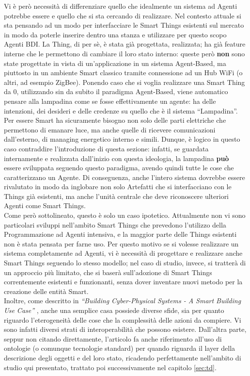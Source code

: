 \documentclass[12pt,a4paper,openright,oneside]{report}
\newcommand{\quotes}[1]{``#1''}
\begin{document}
Vi è però necessità di differenziare quello che idealmente un sistema ad Agenti potrebbe essere e quello che si sta cercando di realizzare. Nel contesto attuale si sta pensando ad un modo per interfacciare le Smart Things esistenti sul mercato in modo da poterle inserire dentro una stanza e utilizzare per questo scopo Agenti BDI. La Thing, di per sè, è stata già progettata, realizzata; ha già feature interne che le permettono di cambiare il loro stato interno: queste però \textbf{non} sono state progettate in vista di un'applicazione in un sistema Agent-Based, ma piuttosto in un ambiente Smart classico tramite connessione ad un Hub WiFi (o altri, ad esempio ZigBee).
Ponendo caso che si voglia realizzare una Smart Thing da 0, utilizzando sin da subito il paradigma Agent-Based, viene automatico pensare alla lampadina come se fosse effettivamente un agente: ha delle intenzioni, dei desideri e delle credenze su quello che è il sistema \quotes{Lampadina}. Per essere Smart ha sicuramente bisogno non solo delle parti elettriche che permettono di emanare luce, ma anche quelle di ricevere comunicazioni dall'esterno, di managing energetico interno e simili. Dunque, è logico in questo caso contraddire l'introduzione di questa sezione: infatti, se guardata internamente e realizzata dall'inizio con questa ideologia, la lampadina \textbf{può} essere sviluppata seguendo questo paradigma, avendo quindi tutte le cose che caratterizzano un Agente. Di conseguenza, anche l'intero sistema dovrebbe essere rivalutato in modo da inglobare non solo Artefatti che si interfacciano con le Things già esistenti, ma anche l'unità centrale che deve riconoscere ulteriori Agenti come Smart Things.\\

Come però sottolineato, questo è solo un caso ipotetico. Attualmente non vi sono particolari sviluppi nell'ambito Smart Things che prevedono l'utilizzo della Programmazione ad Agenti intensiva, e la maggior parte delle Things esistenti non è stata pensata per farne uso. Per questo motivo se si volesse realizzare un sistema completamente ad Agenti, vi è necessità di progettare e realizzare anche Smart Things seguendo lo stesso modello; nel caso di studio, invece, si tratterà di un approccio più limitato, che si baserà sull'adozione di Smart Things correntemente esistenti e funzionanti, senza dover inventare nuovi metodo per la creazione delle entità Smart.\\

Inoltre, come descritto in \textit{\quotes{Building Cyber-Physical Systems - A Smart Building Use Case}} \cite{smartbuilding}, anche una semplice casa possiede diverse sfide, sia per quanto riguardo l'eterogeneità delle cose che la complessità delle azioni da compiere. Vi sono infatti diversi strati di interoperabilità che possono esistere. Dall'altra parte, seppur non citando direttamente, l'articolo fa anche riferimento all'uso di ontologie (o comunque tecnologie standard) per quando riguarda il layer della descrizione degli oggetti e del loro stato, ricadendo perfettamente nell'ambito di studio qui presentato, trattato poi successivamente nel capitolo \ref{sec:td}.
\end{document}
